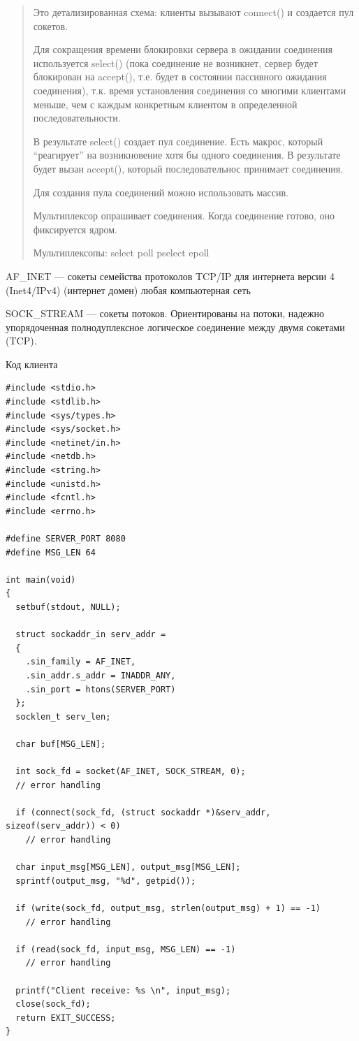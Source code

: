 \begin{quote}
Это детализированная схема: клиенты вызывают connect() и создается пул сокетов.

Для сокращения времени блокировки сервера в ожидании соединения используется select() (пока соединение не возникнет, сервер будет блокирован на accept(), т.е. будет в состоянии пассивного ожидания соединения), т.к. время установления соединения со многими клиентами меньше, чем с каждым конкретным клиентом в определенной последовательности.

В результате select() создает пул соединение. Есть макрос, который “реагирует” на возникновение хотя бы одного соединения. В результате будет вызан accept(), который последовательнос принимает соединения.

Для создания пула соединений можно использовать массив.

Мультиплексор опрашивает соединения. Когда соединение готово, оно фиксируется ядром.

Мультиплексопы: 
select    poll
pselect   epoll
\end{quote}

AF\_INET — сокеты семейства протоколов TCP/IP для интернета версии 4 (Inet4/IPv4) (интернет домен) любая компьютерная сеть

SOCK\_STREAM — сокеты потоков. Ориентированы на потоки, надежно упорядоченная полнодуплексное логическое соединение между двумя сокетами (TCP). 

Код клиента
\begin{lstlisting}
#include <stdio.h>
#include <stdlib.h>
#include <sys/types.h>
#include <sys/socket.h>
#include <netinet/in.h>
#include <netdb.h>
#include <string.h>
#include <unistd.h>
#include <fcntl.h>
#include <errno.h>

#define SERVER_PORT 8080
#define MSG_LEN 64

int main(void)
{
  setbuf(stdout, NULL);

  struct sockaddr_in serv_addr =
  {
    .sin_family = AF_INET,
    .sin_addr.s_addr = INADDR_ANY,
    .sin_port = htons(SERVER_PORT)
  };
  socklen_t serv_len;

  char buf[MSG_LEN];

  int sock_fd = socket(AF_INET, SOCK_STREAM, 0);
  // error handling

  if (connect(sock_fd, (struct sockaddr *)&serv_addr, sizeof(serv_addr)) < 0)
    // error handling

  char input_msg[MSG_LEN], output_msg[MSG_LEN];
  sprintf(output_msg, "%d", getpid());

  if (write(sock_fd, output_msg, strlen(output_msg) + 1) == -1)
    // error handling

  if (read(sock_fd, input_msg, MSG_LEN) == -1)
    // error handling

  printf("Client receive: %s \n", input_msg);
  close(sock_fd);
  return EXIT_SUCCESS;
}
\end{lstlisting}

